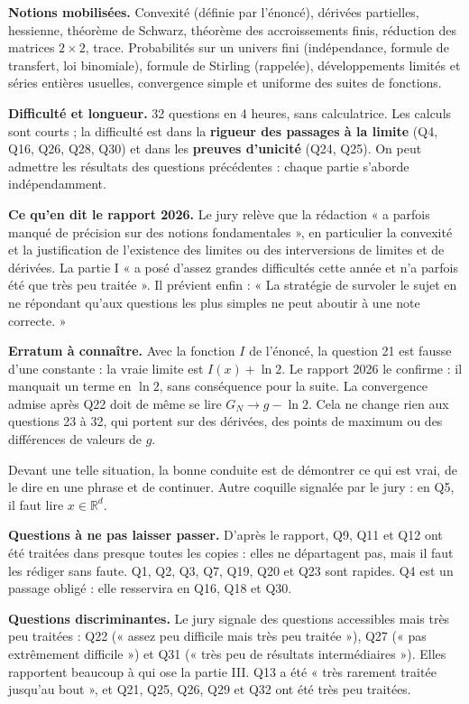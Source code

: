\documentclass[11pt,a4paper]{article}
\begin{document}
\textbf{Notions mobilisées.} Convexité (définie par l'énoncé), dérivées partielles, hessienne, théorème de Schwarz, théorème des accroissements finis, réduction des matrices \(2\times2\), trace. Probabilités sur un univers fini (indépendance, formule de transfert, loi binomiale), formule de Stirling (rappelée), développements limités et séries entières usuelles, convergence simple et uniforme des suites de fonctions.

\textbf{Difficulté et longueur.} 32 questions en 4 heures, sans calculatrice. Les calculs sont courts ; la difficulté est dans la \textbf{rigueur des passages à la limite} (Q4, Q16, Q26, Q28, Q30) et dans les \textbf{preuves d'unicité} (Q24, Q25). On peut admettre les résultats des questions précédentes : chaque partie s'aborde indépendamment.

\textbf{Ce qu'en dit le rapport 2026.} Le jury relève que la rédaction « a parfois manqué de précision sur des notions fondamentales », en particulier la convexité et la justification de l'existence des limites ou des interversions de limites et de dérivées. La partie I « a posé d'assez grandes difficultés cette année et n'a parfois été que très peu traitée ». Il prévient enfin : « La stratégie de survoler le sujet en ne répondant qu'aux questions les plus simples ne peut aboutir à une note correcte. »

\textbf{Erratum à connaître.} Avec la fonction \(I\) de l'énoncé, la question 21 est fausse d'une constante : la vraie limite est \(I(x)+\ln2\). Le rapport 2026 le confirme : il manquait un terme en \(\ln 2\), sans conséquence pour la suite. La convergence admise après Q22 doit de même se lire \(G_N\to g-\ln2\). Cela ne change rien aux questions 23 à 32, qui portent sur des dérivées, des points de maximum ou des différences de valeurs de \(g\).

Devant une telle situation, la bonne conduite est de démontrer ce qui est vrai, de le dire en une phrase et de continuer. Autre coquille signalée par le jury : en Q5, il faut lire \(x\in\mathbb R^d\).

\textbf{Questions à ne pas laisser passer.} D'après le rapport, Q9, Q11 et Q12 ont été traitées dans presque toutes les copies : elles ne départagent pas, mais il faut les rédiger sans faute. Q1, Q2, Q3, Q7, Q19, Q20 et Q23 sont rapides. Q4 est un passage obligé : elle resservira en Q16, Q18 et Q30.

\textbf{Questions discriminantes.} Le jury signale des questions accessibles mais très peu traitées : Q22 (« assez peu difficile mais très peu traitée »), Q27 (« pas extrêmement difficile ») et Q31 (« très peu de résultats intermédiaires »). Elles rapportent beaucoup à qui ose la partie III. Q13 a été « très rarement traitée jusqu'au bout », et Q21, Q25, Q26, Q29 et Q32 ont été très peu traitées.
\end{document}
